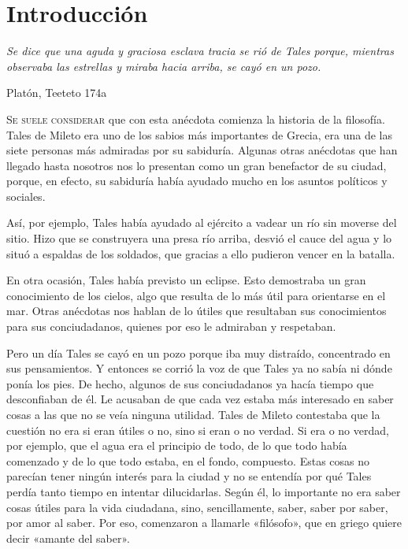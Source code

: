 \documentclass[draft,9pt,letterpaper,twocolumn,openany]{extbook}
\newcommand*\initfamily{\usefont{U}{Zallman}{xl}{n}}
\newcommand{\dcap}[2]{
	 \lettrine[nindent=0em,findent=2pt,lines=3,loversize=-0.10]{\initfamily #1}{#2}
 }
\newcommand{\notar}[1]{\marginnote{\small\sffamily #1}[-.8em]}
\begin{document}
\chapter*{ Introducción }

\begin{center}
	\begin{minipage}{.5\linewidth}\itshape
	Se dice que una aguda y graciosa esclava tracia
	se rió de Tales porque, mientras observaba las estrellas
	y miraba hacia arriba, se cayó en un pozo.
\begin{flushright}\upshape
		Platón, Teeteto 174a
\end{flushright}
	\end{minipage}
\end{center}

\dcap{S}{e suele considerar}que con esta anécdota comienza la
historia de la filosofía. Tales de Mileto era uno de los sabios más
importantes de Grecia, era una de las siete
personas más admiradas por su sabiduría. Algunas otras
anécdotas que han llegado hasta nosotros nos lo presentan
como un gran benefactor de su ciudad, porque, en efecto,
su sabiduría había ayudado mucho en los asuntos políticos
y sociales.

Así, por ejemplo, Tales había ayudado al ejército a vadear
un río sin moverse del sitio. Hizo que se construyera
una presa río arriba, desvió el cauce del agua y lo situó a
espaldas de los soldados, que gracias a ello pudieron
vencer en la batalla.

En otra ocasión, Tales había previsto un eclipse. Esto
demostraba un gran conocimiento de los cielos, algo que
resulta de lo más útil para orientarse en el mar. Otras
anécdotas nos hablan de lo útiles que resultaban sus
conocimientos para sus conciudadanos, quienes por eso le
admiraban y respetaban.

Pero un día Tales se cayó en un pozo porque iba muy
distraído, concentrado en sus pensamientos. Y entonces
se corrió la voz de que Tales ya no sabía ni dónde ponía los
pies. De hecho, algunos de sus conciudadanos ya hacía
tiempo que desconfiaban de él. Le acusaban de que
cada vez estaba más interesado en saber cosas a las que
no se veía ninguna utilidad. Tales de Mileto contestaba
que la cuestión no era si eran útiles o no, sino si eran o no
verdad. Si era o no verdad, por ejemplo, que el agua era el
principio de todo, de lo que todo había comenzado y de lo
que todo estaba, en el fondo, compuesto. Estas cosas no
parecían tener ningún interés para la ciudad y no se
entendía por qué Tales perdía tanto tiempo en intentar
dilucidarlas. Según él, lo importante no era saber cosas
útiles para la vida ciudadana, sino, sencillamente, saber,
saber por saber, por amor al saber. Por eso, comenzaron a
llamarle «filósofo», que en griego quiere decir «amante del
saber».
\end{document}
